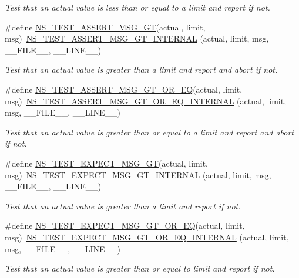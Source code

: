 \begin{DoxyCompactItemize}
\begin{DoxyCompactList}\small\item\em Test that an actual value is less than or equal to a limit and report if not. \end{DoxyCompactList}\item 
\#define \hyperlink{group__testing_ga868cfb773df312b867a506bdd2e3cbef}{N\+S\+\_\+\+T\+E\+S\+T\+\_\+\+A\+S\+S\+E\+R\+T\+\_\+\+M\+S\+G\+\_\+\+GT}(actual,  limit,  msg)~\hyperlink{group__testingimpl_gac0702d4efc2f4d35963c5da2d6fa2c98}{N\+S\+\_\+\+T\+E\+S\+T\+\_\+\+A\+S\+S\+E\+R\+T\+\_\+\+M\+S\+G\+\_\+\+G\+T\+\_\+\+I\+N\+T\+E\+R\+N\+AL} (actual, limit, msg, \+\_\+\+\_\+\+F\+I\+L\+E\+\_\+\+\_\+, \+\_\+\+\_\+\+L\+I\+N\+E\+\_\+\+\_\+)
\begin{DoxyCompactList}\small\item\em Test that an actual value is greater than a limit and report and abort if not. \end{DoxyCompactList}\item 
\#define \hyperlink{group__testing_gae62e6e3e789f618a783576440f4cec2f}{N\+S\+\_\+\+T\+E\+S\+T\+\_\+\+A\+S\+S\+E\+R\+T\+\_\+\+M\+S\+G\+\_\+\+G\+T\+\_\+\+O\+R\+\_\+\+EQ}(actual,  limit,  msg)~\hyperlink{group__testingimpl_gaf962c2cdf0c9e474ac74427146594e59}{N\+S\+\_\+\+T\+E\+S\+T\+\_\+\+A\+S\+S\+E\+R\+T\+\_\+\+M\+S\+G\+\_\+\+G\+T\+\_\+\+O\+R\+\_\+\+E\+Q\+\_\+\+I\+N\+T\+E\+R\+N\+AL} (actual, limit, msg, \+\_\+\+\_\+\+F\+I\+L\+E\+\_\+\+\_\+, \+\_\+\+\_\+\+L\+I\+N\+E\+\_\+\+\_\+)
\begin{DoxyCompactList}\small\item\em Test that an actual value is greater than or equal to a limit and report and abort if not. \end{DoxyCompactList}\item 
\#define \hyperlink{group__testing_ga6ba43672d44c1e85acfb1daf2af66612}{N\+S\+\_\+\+T\+E\+S\+T\+\_\+\+E\+X\+P\+E\+C\+T\+\_\+\+M\+S\+G\+\_\+\+GT}(actual,  limit,  msg)~\hyperlink{group__testingimpl_ga37eb592b062b1d8ff5086dbbc2668994}{N\+S\+\_\+\+T\+E\+S\+T\+\_\+\+E\+X\+P\+E\+C\+T\+\_\+\+M\+S\+G\+\_\+\+G\+T\+\_\+\+I\+N\+T\+E\+R\+N\+AL} (actual, limit, msg, \+\_\+\+\_\+\+F\+I\+L\+E\+\_\+\+\_\+, \+\_\+\+\_\+\+L\+I\+N\+E\+\_\+\+\_\+)
\begin{DoxyCompactList}\small\item\em Test that an actual value is greater than a limit and report if not. \end{DoxyCompactList}\item 
\#define \hyperlink{group__testing_ga0c6b73fec1e93735e5154db9c12c338c}{N\+S\+\_\+\+T\+E\+S\+T\+\_\+\+E\+X\+P\+E\+C\+T\+\_\+\+M\+S\+G\+\_\+\+G\+T\+\_\+\+O\+R\+\_\+\+EQ}(actual,  limit,  msg)~\hyperlink{group__testingimpl_ga63a10e334a06ab384256d1fbc4b7eb29}{N\+S\+\_\+\+T\+E\+S\+T\+\_\+\+E\+X\+P\+E\+C\+T\+\_\+\+M\+S\+G\+\_\+\+G\+T\+\_\+\+O\+R\+\_\+\+E\+Q\+\_\+\+I\+N\+T\+E\+R\+N\+AL} (actual, limit, msg, \+\_\+\+\_\+\+F\+I\+L\+E\+\_\+\+\_\+, \+\_\+\+\_\+\+L\+I\+N\+E\+\_\+\+\_\+)
\begin{DoxyCompactList}\small\item\em Test that an actual value is greater than or equal to limit and report if not. \end{DoxyCompactList}\end{DoxyCompactItemize}
